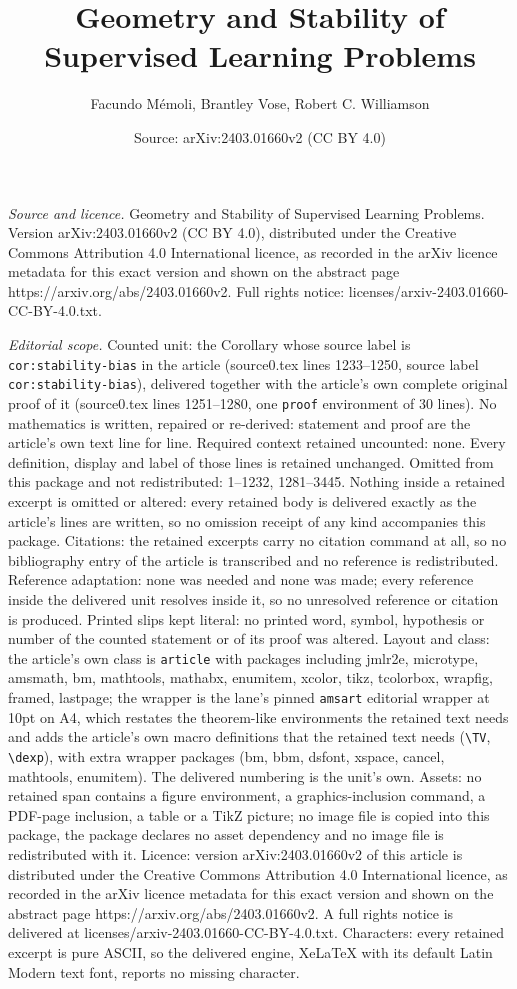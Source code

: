 \documentclass[10pt,a4paper]{amsart}
\title[Geometry and Stability of Supervised Learning Problems]{Geometry and Stability of Supervised Learning Problems}
\author{Facundo M\'emoli, Brantley Vose, Robert C. Williamson}
\date{Source: arXiv:2403.01660v2 (CC BY 4.0)}
\begin{document}
\maketitle

\noindent\emph{Source and licence.} Geometry and Stability of Supervised Learning Problems. Version arXiv:2403.01660v2 (CC BY 4.0), distributed under the Creative Commons Attribution 4.0 International licence, as recorded in the arXiv licence metadata for this exact version and shown on the abstract page https://arxiv.org/abs/2403.01660v2. Full rights notice: licenses/arxiv-2403.01660-CC-BY-4.0.txt.\par\smallskip

\noindent\textit{Editorial scope.} Counted unit: the Corollary whose source label is \texttt{cor:stability-bias} in the article (source0.tex lines 1233--1250, source label \texttt{cor:stability-bias}), delivered together with the article's own complete original proof of it (source0.tex lines 1251--1280, one \texttt{proof} environment of 30 lines). No mathematics is written, repaired or re-derived: statement and proof are the article's own text line for line. Required context retained uncounted: none. Every definition, display and label of those lines is retained unchanged. Omitted from this package and not redistributed: 1--1232, 1281--3445. Nothing inside a retained excerpt is omitted or altered: every retained body is delivered exactly as the article's lines are written, so no omission receipt of any kind accompanies this package. Citations: the retained excerpts carry no citation command at all, so no bibliography entry of the article is transcribed and no reference is redistributed. Reference adaptation: none was needed and none was made; every reference inside the delivered unit resolves inside it, so no unresolved reference or citation is produced. Printed slips kept literal: no printed word, symbol, hypothesis or number of the counted statement or of its proof was altered. Layout and class: the article's own class is \texttt{article} with packages including jmlr2e, microtype, amsmath, bm, mathtools, mathabx, enumitem, xcolor, tikz, tcolorbox, wrapfig, framed, lastpage; the wrapper is the lane's pinned \texttt{amsart} editorial wrapper at 10pt on A4, which restates the theorem-like environments the retained text needs and adds the article's own macro definitions that the retained text needs (\texttt{\textbackslash TV}, \texttt{\textbackslash dexp}), with extra wrapper packages (bm, bbm, dsfont, xspace, cancel, mathtools, enumitem). The delivered numbering is the unit's own. Assets: no retained span contains a figure environment, a graphics-inclusion command, a PDF-page inclusion, a table or a TikZ picture; no image file is copied into this package, the package declares no asset dependency and no image file is redistributed with it. Licence: version arXiv:2403.01660v2 of this article is distributed under the Creative Commons Attribution 4.0 International licence, as recorded in the arXiv licence metadata for this exact version and shown on the abstract page https://arxiv.org/abs/2403.01660v2. A full rights notice is delivered at licenses/arxiv-2403.01660-CC-BY-4.0.txt. Characters: every retained excerpt is pure ASCII, so the delivered engine, XeLaTeX with its default Latin Modern text font, reports no missing character.
\end{document}

